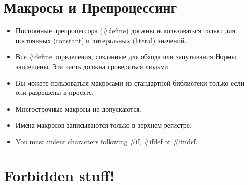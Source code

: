 \documentclass{42-ru}
\begin{document}
                
    \section{Макросы и Препроцессинг}

        \begin{itemize}

            \item Постоянные препроцессора (\#define) должны использоваться
                только для постоянных (constant) и литеральных (literal) значений.

            \item Все \#define определения, созданные для обхода или запутывания Нормы запрещены.
                Эта часть должна проверяться людьми.

            \item Вы можете пользоваться макросами из стандартной библиотеки только если они разрешены в проекте.

            \item Многострочные макросы не допускаются.

            \item Имена макросов записываются только в верхнем регистре.

            \item You must indent characters following \#if, \#ifdef
                or \#ifndef.

        \end{itemize}
        \newpage


    \section{Forbidden stuff!}
\end{document}
